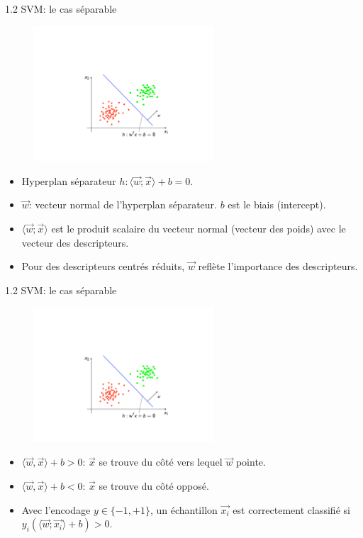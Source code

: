 \begin{frame}{1.2 SVM: le cas séparable}
  \begin{figure}[htb]
    \includegraphics[width=0.6\textwidth]{figures/SVM_1a.pdf}
  \end{figure}
  \begin{itemize}
    \item Hyperplan séparateur $h: \langle \overrightarrow{w};\overrightarrow{x} \rangle + b = 0$.
    \item $\overrightarrow{w}$: vecteur normal de l'hyperplan séparateur. $b$ est le biais (intercept). 
    \item $\langle\overrightarrow{w};\overrightarrow{x} \rangle$ est le produit scalaire du vecteur normal (vecteur des poids) avec le vecteur des descripteurs. 
    \item Pour des descripteurs centrés réduits, $\overrightarrow{w}$ reflète l'importance des descripteurs.
  \end{itemize}
\end{frame}

\begin{frame}{1.2 SVM: le cas séparable}
  \begin{figure}[htb]
    \includegraphics[width=0.6\textwidth]{figures/SVM_1a.pdf}
  \end{figure}
  \begin{itemize}
    \item $\langle\overrightarrow{w},\overrightarrow{x} \rangle + b  > 0$: $\overrightarrow{x}$ se trouve du côté vers lequel $\overrightarrow{w}$ pointe. 
    \item $\langle \overrightarrow{w}, \overrightarrow{x} \rangle + b  < 0$: $\overrightarrow{x}$ se trouve du côté opposé. 
    \item Avec l'encodage $y\in\{-1,+1\}$, un échantillon $\overrightarrow{x_i}$ est correctement classifié si $y_i(\langle \overrightarrow{w};\overrightarrow{x_i} \rangle + b) > 0$.
  \end{itemize}
\end{frame}

